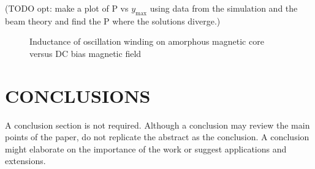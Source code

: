 \documentclass[letterpaper, 10 pt, conference]{ieeeconf}  %
\begin{document}
(TODO opt: make a plot of P vs $y_{\text{max}}$ using data from the simulation and the beam theory and find the P where the solutions diverge.)


   \begin{figure}[thpb]
      \centering
      \caption{Inductance of oscillation winding on amorphous
       magnetic core versus DC bias magnetic field}
      \label{figurelabel}
   \end{figure}


\section{CONCLUSIONS}

A conclusion section is not required. Although a conclusion may review the main points of the paper, do not replicate the abstract as the conclusion. A conclusion might elaborate on the importance of the work or suggest applications and extensions.

\addtolength{\textheight}{-12cm}   %




\end{document}
